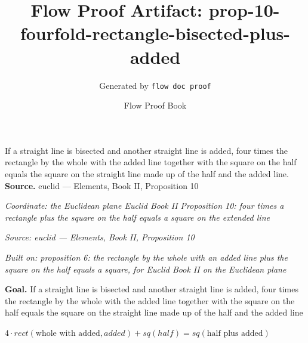 \documentclass[11pt]{article}
\title{Flow Proof Artifact: prop-10-fourfold-rectangle-bisected-plus-added}
\author{Generated by \texttt{flow doc proof}}
\date{Flow Proof Book}
\theoremstyle{definition}
\begin{document}
\maketitle
If a straight line is bisected and another straight line is added, four times the rectangle by the whole with the added line together with the square on the half equals the square on the straight line made up of the half and the added line.\\[0.5em]
\textbf{Source.} euclid — Elements, Book II, Proposition 10\\[0.5em]
\bigskip
{}\par
\smallskip\noindent\textit{Coordinate: the Euclidean plane \cdot Euclid Book II \cdot Proposition 10: four times a rectangle plus the square on the half equals a square on the extended line}\par
\smallskip\noindent\textit{Source: euclid — Elements, Book II, Proposition 10}\par
\smallskip\noindent\textit{Built on: proposition 6: the rectangle by the whole with an added line plus the square on the half equals a square, for Euclid Book II on the Euclidean plane}\par
\medskip
\noindent\textbf{Goal.} If a straight line is bisected and another straight line is added, four times the rectangle by the whole with the added line together with the square on the half equals the square on the straight line made up of the half and the added line\par
\noindent$\displaystyle 4 \cdot rect(\text{whole with added}, added) + sq(half) = sq(\text{half plus added})$\par
\medskip
\noindent
\end{document}
